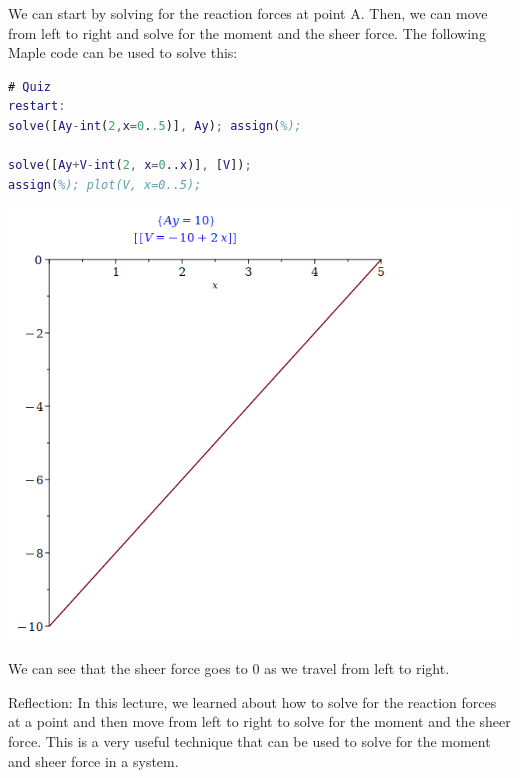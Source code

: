 \documentclass{article}[14pt, letterpaper, Times New Roman]
\begin{document}
We can start by solving for the reaction forces at point A.
Then, we can move from left to right and solve for the moment and the sheer force.
The following Maple code can be used to solve this:

\begin{lstlisting}[language=matlab]
# Quiz
restart:
solve([Ay-int(2,x=0..5)], Ay); assign(%);

solve([Ay+V-int(2, x=0..x)], [V]);
assign(%); plot(V, x=0..5);
\end{lstlisting}

\includegraphics[width=15cm]{l13-quiz-o.png}

We can see that the sheer force goes to 0 as we travel from left to right.

\medskip

Reflection: In this lecture, we learned about how to solve for the reaction forces at a point and then move from left to right to solve for the moment and the sheer force. This is a very useful technique that can be used to solve for the moment and sheer force in a system.
\end{document}
